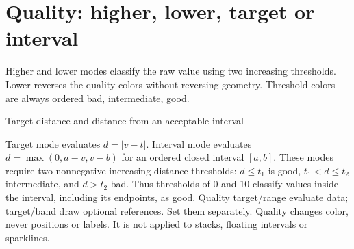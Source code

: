 \section{Quality: higher, lower, target or interval}
Higher and lower modes classify the raw value using two increasing thresholds.
Lower reverses the quality colors without reversing geometry. Threshold colors
are always ordered bad, intermediate, good.

\begin{demo}{Target distance and distance from an acceptable interval}


\end{demo}
Target mode evaluates $d=|v-t|$. Interval mode evaluates
$d=\max(0,a-v,v-b)$ for an ordered closed interval $[a,b]$.
These modes require two nonnegative increasing distance thresholds:
$d\le t_1$ is good, $t_1<d\le t_2$ intermediate, and $d>t_2$ bad.
Thus thresholds of 0 and 10 classify values inside the interval, including its
endpoints, as good. Quality target/range evaluate data; target/band draw optional
references. Set them separately. Quality changes color, never positions or labels.
It is not applied to stacks, floating intervals or sparklines.
